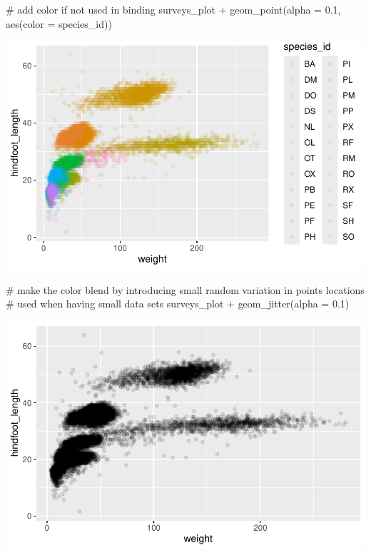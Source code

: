 \documentclass[
  letterpaper,
  DIV=11,
  numbers=noendperiod]{scrreprt}
\newenvironment{Shaded}{\begin{snugshade}}{\end{snugshade}}
\newcommand{\AttributeTok}[1]{\textcolor[rgb]{0.40,0.45,0.13}{#1}}
\newcommand{\CommentTok}[1]{\textcolor[rgb]{0.37,0.37,0.37}{#1}}
\newcommand{\FloatTok}[1]{\textcolor[rgb]{0.68,0.00,0.00}{#1}}
\newcommand{\FunctionTok}[1]{\textcolor[rgb]{0.28,0.35,0.67}{#1}}
\newcommand{\NormalTok}[1]{\textcolor[rgb]{0.00,0.23,0.31}{#1}}
\newcommand{\SpecialCharTok}[1]{\textcolor[rgb]{0.37,0.37,0.37}{#1}}
\begin{document}
\begin{Shaded}
\begin{Highlighting}[]
\CommentTok{\# add color if not used in binding}
\NormalTok{surveys\_plot }\SpecialCharTok{+} \FunctionTok{geom\_point}\NormalTok{(}\AttributeTok{alpha =} \FloatTok{0.1}\NormalTok{, }\FunctionTok{aes}\NormalTok{(}\AttributeTok{color =}\NormalTok{ species\_id))}
\end{Highlighting}
\end{Shaded}

\includegraphics{src/notebooks/r_files/figure-pdf/unnamed-chunk-45-4.pdf}

\begin{Shaded}
\begin{Highlighting}[]
\CommentTok{\# make the color blend by introducing small random variation in points locations}
\CommentTok{\# used when having small data sets}
\NormalTok{surveys\_plot }\SpecialCharTok{+} \FunctionTok{geom\_jitter}\NormalTok{(}\AttributeTok{alpha =} \FloatTok{0.1}\NormalTok{)}
\end{Highlighting}
\end{Shaded}

\includegraphics{src/notebooks/r_files/figure-pdf/unnamed-chunk-45-5.pdf}
\end{document}
